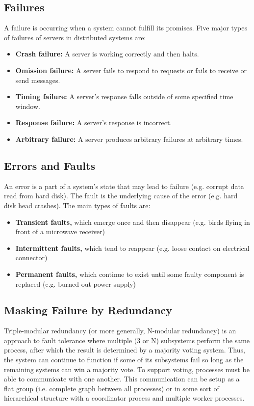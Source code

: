 \documentclass[12pt,titlepage]{article}
\begin{document}
    \subsection{Failures}
      A failure is occurring when a system cannot fulfill its promises. Five major types of failures of servers in distributed systems are:
      \begin{itemize}
        \item \textbf{Crash failure:} A server is working correctly and then halts.
        \item \textbf{Omission failure:} A server fails to respond to requests or fails to receive or send messages.
        \item \textbf{Timing failure:} A server's response falls outside of some specified time window.
        \item \textbf{Response failure:} A server's response is incorrect.
        \item \textbf{Arbitrary failure:} A server produces arbitrary failures at arbitrary times.
      \end{itemize}

    \subsection{Errors and Faults}
      An error is a part of a system's state that may lead to failure (e.g. corrupt data read from hard disk). The fault is the underlying cause
      of the error (e.g. hard disk head crashes). The main types of faults are:
      \begin{itemize}
        \item \textbf{Transient faults,} which emerge once and then disappear (e.g. birds flying in front of a microwave receiver)
        \item \textbf{Intermittent faults,} which tend to reappear (e.g. loose contact on electrical connector)
        \item \textbf{Permanent faults,} which continue to exist until some faulty component is replaced (e.g. burned out power supply)
      \end{itemize}

    \subsection{Masking Failure by Redundancy}
      Triple-modular redundancy (or more generally, N-modular redundancy) is an approach to fault tolerance where multiple (3 or N) subsystems perform the same process,
      after which the result is determined by a majority voting system. Thus, the system can continue to function if some of its subsystems fail so long as the
      remaining systems can win a majority vote. To support voting, processes must be able to communicate with one another. This communication can be setup as
      a flat group (i.e. complete graph between all processes) or in some sort of hierarchical structure with a coordinator process and multiple worker processes.
\end{document}
